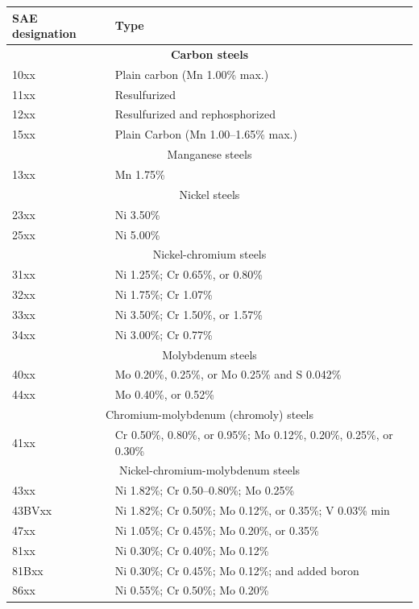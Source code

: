 \documentclass[
10pt,
a4paper,
openany,
svgnames,
]{book}
\begin{document}
\begin{table}[h] 
  \centering
  \begin{tabular}{ll}
    \toprule
    SAE designation & Type \\
    \midrule
    \multicolumn{2}{c}{\textbf{Carbon steels}}  \\
    10xx & Plain carbon (Mn 1.00\% max.) \\
    11xx & Resulfurized \\
    12xx & Resulfurized and rephosphorized \\
    15xx & Plain Carbon (Mn 1.00–1.65\% max.) \\
    \multicolumn{2}{c}{Manganese steels}  \\
    13xx & Mn 1.75\% \\
    \multicolumn{2}{c}{Nickel steels} \\
    23xx & Ni 3.50\% \\
    25xx & Ni 5.00\% \\
    \multicolumn{2}{c}{Nickel-chromium steels} \\
    31xx & Ni 1.25\%; Cr 0.65\%, or 0.80\% \\
    32xx & Ni 1.75\%; Cr 1.07\% \\
    33xx & Ni 3.50\%; Cr 1.50\%, or 1.57\% \\
    34xx & Ni 3.00\%; Cr 0.77\% \\
    \multicolumn{2}{c}{Molybdenum steels} \\
    40xx & Mo 0.20\%, 0.25\%, or Mo 0.25\% and S 0.042\% \cite{bringas2004handbook} \\
    44xx & Mo 0.40\%, or 0.52\% \\
    \multicolumn{2}{c}{Chromium-molybdenum (chromoly) steels} \\
    41xx & Cr 0.50\%, 0.80\%, or 0.95\%; Mo 0.12\%, 0.20\%, 0.25\%, or 0.30\% \\
    \multicolumn{2}{c}{Nickel-chromium-molybdenum steels} \\
    43xx & Ni 1.82\%; Cr 0.50–0.80\%; Mo 0.25\% \\
    43BVxx & Ni 1.82\%; Cr 0.50\%; Mo 0.12\%, or 0.35\%; V 0.03\% min \\
    47xx & Ni 1.05\%; Cr 0.45\%; Mo 0.20\%, or 0.35\% \\
    81xx & Ni 0.30\%; Cr 0.40\%; Mo 0.12\% \\
    81Bxx & Ni 0.30\%; Cr 0.45\%; Mo 0.12\%; and added boron \cite{bringas2004handbook} \\
    86xx & Ni 0.55\%; Cr 0.50\%; Mo 0.20\% \\

\end{tabular}
\end{table}
\end{document}
